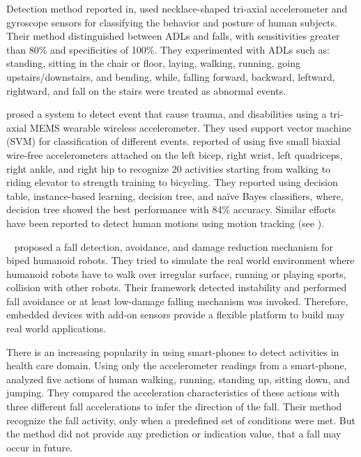 \documentclass{IEEEtran}
\begin{document}
Detection method reported in\cite{baekFallDetection2013}, used necklace-shaped tri-axial
accelerometer  and  gyroscope  sensors  for classifying  the  behavior  and  posture  of  human
 subjects. Their method distinguished between  ADLs and  falls, with  sensitivities  greater  than 
 80\%  and specificities  of  100\%. They experimented with ADLs such as: standing, sitting in the 
 chair or floor, laying, walking, running, going upstairs/downstairs, and bending, while, 
 falling forward, backward, leftward, rightward, and fall on the stairs were treated as abnormal 
 events. 
 
\cite{leoneFallDetection2013} prosed a system to detect event that cause trauma, and disabilities
using a tri-axial MEMS wearable wireless accelerometer. They used support vector machine (SVM) for
classification of different events. \cite{BaoActivityrecognition2004} reported of using five 
small biaxial wire-free accelerometers attached  on the left bicep, right wrist, left quadriceps, 
right ankle, and right hip to recognize 20 activities starting from  walking  to  riding elevator  
to  strength  training to bicycling. They reported using decision table, instance-based learning, 
decision tree, and na\"{i}ve Bayes classifiers, where, decision tree showed the best performance 
with 84\% accuracy.  Similar efforts have been reported to detect human motions using motion 
tracking (see 
\cite{dumitracheFallDetection2013,kumarActivitAndFallDetection2013,krishnanActivityRecognition2014,gaoActivityRecognition2014,alvarezActivityAndFallRecognotion2015}).
 


{~\cite{moyaFallAndDamageDetection2015}} proposed a fall detection, avoidance, and damage 
reduction mechanism for biped humanoid robots. They tried to simulate the real world environment 
where humanoid robots have to walk over irregular surface, running or playing sports, collision 
with other robots. Their framework detected instability and performed fall avoidance or at 
least low-damage falling mechanism was invoked. Therefore, embedded devices  with add-on sensors 
provide a flexible platform to build may real world applications. 


There is an increasing popularity in using smart-phones to detect activities in health care domain. 
Using only the accelerometer readings from a smart-phone, \cite{baiFallDetectionPhone2013} analyzed five 
actions of human walking, running, standing up, sitting down, and jumping. They compared the 
acceleration characteristics of these actions with three different fall accelerations to infer the 
direction of the fall. Their method recognize the fall activity, only when a predefined set of 
conditions were met. But the method did not provide any prediction or indication value, that a fall 
may occur in future. 
\end{document}

